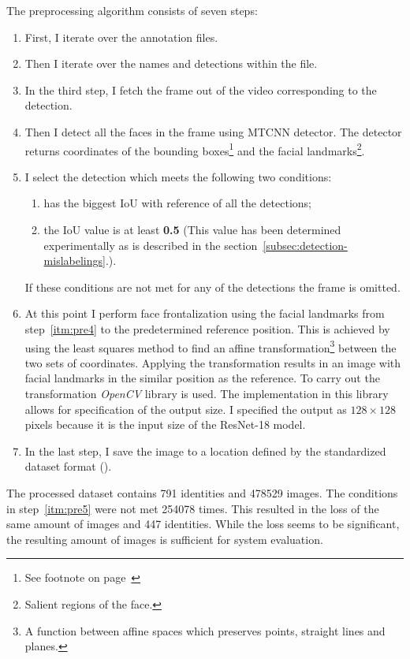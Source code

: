 The preprocessing algorithm consists of seven steps:
\begin{enumerate}
    \item First, I iterate over the annotation files.
    \item Then I iterate over the names and detections within the file.
    \item In the third step, I fetch the frame out of the video corresponding to the detection.
    \item \label{itm:pre4} Then I detect all the faces in the frame using MTCNN detector.
    The detector returns coordinates of the bounding boxes\footnote{See footnote on page~\pageref{foot:bbox}} and the
    facial landmarks\footnote{Salient regions of the face.}.
    \item \label{itm:pre5} I select the detection which meets the following two conditions:
    \begin{enumerate}
        \item has the biggest IoU with reference of all the detections;
        \item the IoU value is at least \textbf{0.5} (This value has been determined experimentally as
        is described in the section~\ref{subsec:detection-mislabelings}.).
    \end{enumerate}
    If these conditions are not met for any of the detections the frame is omitted.
    \item At this point I perform face frontalization using the facial landmarks from step~\ref{itm:pre4} to the
    predetermined reference position.
    This is achieved by using the least squares method to find an affine transformation\footnote{A function between
    affine spaces which preserves points, straight lines and planes.} between the two sets of coordinates.
    Applying the transformation results in an image with facial landmarks in the similar position as the reference.
    To carry out the transformation \textit{OpenCV} library is used.
    The implementation in this library allows for specification of the output size.
    I specified the output as $128 \times 128$ pixels because it is the input size of the ResNet-18 model.
    \item In the last step, I save the image to a location defined by the standardized dataset format
    ().
\end{enumerate}

The processed dataset contains 791 identities and 478529 images.
The conditions in step~\ref{itm:pre5} were not met 254078 times.
This resulted in the loss of the same amount of images and 447 identities.
While the loss seems to be significant, the resulting amount of images is sufficient for system evaluation.

